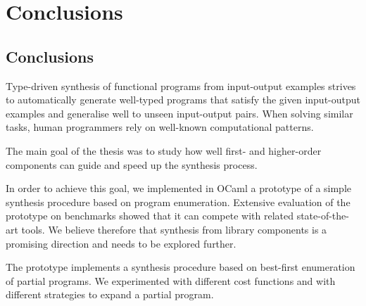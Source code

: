\chapter{Conclusions} \label{ch:conclusions}

\section{Conclusions}

Type-driven synthesis of functional programs from input-output examples   strives to automatically generate well-typed programs that satisfy the given input-output examples and generalise well to unseen input-output pairs. When solving similar tasks, human programmers rely on well-known computational patterns.


The main goal of the thesis was to study how well first- and higher-order components can guide and speed up the synthesis process.

In order to achieve this goal, we implemented in OCaml a prototype of a simple synthesis procedure based on program enumeration. Extensive evaluation of the prototype on benchmarks showed that it can compete with related state-of-the-art tools. We believe therefore that synthesis from library components is a promising direction and needs to be explored further.

The prototype implements a synthesis procedure based on best-first enumeration of partial programs. We experimented with different cost functions and with different strategies to expand a partial program.

